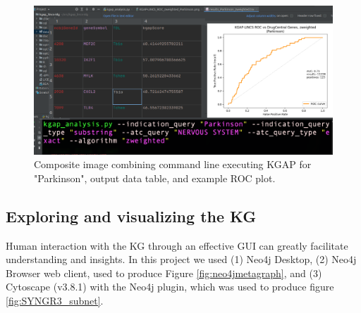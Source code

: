 \begin{figure}
	\includegraphics[width=\textwidth]{figures/kgap/KGAP_PyCharm_composite2.png}
	\caption{Composite image combining command line executing KGAP for "Parkinson",  output data table, and example ROC plot.}
	\label{fig:pycharm}
\end{figure}

\subsection{Exploring and visualizing the KG}

Human interaction with the KG through an effective GUI can greatly facilitate understanding and insights.  In this project we used (1) Neo4j Desktop, (2) Neo4j  Browser web client, used to produce Figure \ref{fig:neo4jmetagraph}, and (3) Cytoscape (v3.8.1) with the Neo4j plugin, which was used to produce figure \ref{fig:SYNGR3_subnet}.  

